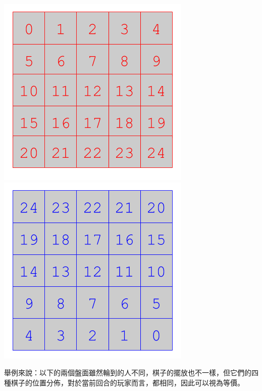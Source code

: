\documentclass[12pt,a4paper]{article}
\begin{document}
        \includegraphics[scale = 0.5]{img/RedNumber.png}\includegraphics[scale = 0.5]{img/BlueNumber.png}

        舉例來說：以下的兩個盤面雖然輪到的人不同，棋子的擺放也不一樣，但它們的四種棋子的位置分佈，對於當前回合的玩家而言，都相同，因此可以視為等價。
\end{document}
